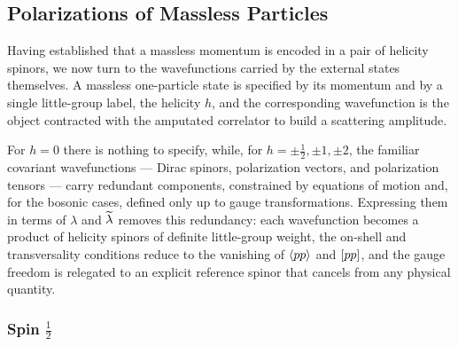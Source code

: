 \subsection{Polarizations of Massless Particles\label{sec:polarizations}}

Having established that a massless momentum is encoded in a pair of helicity spinors, we now turn
to the wavefunctions carried by the external states themselves. A massless one-particle state is
specified by its momentum and by a single little-group label, the helicity $h$, and the
corresponding wavefunction is the object contracted with the amputated correlator to build a
scattering amplitude. 

For $h=0$ there is nothing to specify, while, for $h=\pm\frac{1}{2},\pm 1,
\pm 2$, the familiar covariant wavefunctions --- Dirac spinors, polarization vectors, and
polarization tensors --- carry redundant components, constrained by equations of motion and, for
the bosonic cases, defined only up to gauge transformations. Expressing them in terms of $\lambda$
and $\widetilde{\lambda}$ removes this redundancy: each wavefunction becomes a product of helicity
spinors of definite little-group weight, the on-shell and transversality conditions reduce to the
vanishing of $\langle p p \rangle$ and $\lbrack p p \rbrack$, and the gauge freedom is relegated to an explicit
reference spinor that cancels from any physical quantity.

\subsubsection{Spin $\frac{1}{2}$}

